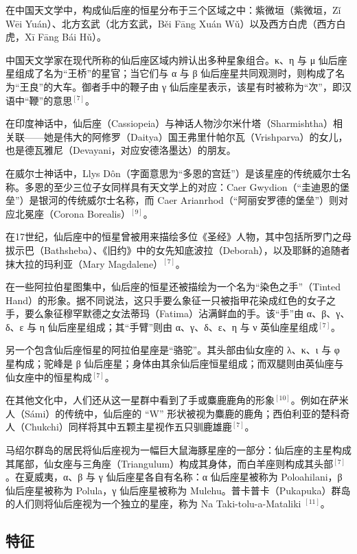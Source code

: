 在中国天文学中，构成仙后座的恒星分布于三个区域之中：紫微垣（紫微垣，Zǐ Wēi Yuán）、北方玄武（北方玄武，Běi Fāng Xuán Wǔ）以及西方白虎（西方白虎，Xī Fāng Bái Hǔ）。

中国天文学家在现代所称的仙后座区域内辨认出多种星象组合。κ、η 与 μ 仙后座星组成了名为“王桥”的星官；当它们与 α 与 β 仙后座星共同观测时，则构成了名为“王良”的大车。御者手中的鞭子由 γ 仙后座星表示，该星有时被称为“次”，即汉语中“鞭”的意思$^{[7]}$。

在印度神话中，仙后座（Cassiopeia）与神话人物沙尔米什塔（Sharmishtha）相关联——她是伟大的阿修罗（Daitya）国王弗里什帕尔瓦（Vrishparva）的女儿，也是德瓦雅尼（Devayani，对应安德洛墨达）的朋友。

在威尔士神话中，Llys Dôn（字面意思为“多恩的宫廷”）是该星座的传统威尔士名称。多恩的至少三位子女同样具有天文学上的对应：Caer Gwydion（“圭迪恩的堡垒”）是银河的传统威尔士名称，而 Caer Arianrhod（“阿丽安罗德的堡垒”）则对应北冕座（Corona Borealis）$^{[9]}$。

在17世纪，仙后座中的恒星曾被用来描绘多位《圣经》人物，其中包括所罗门之母拔示巴（Bathsheba）、《旧约》中的女先知底波拉（Deborah），以及耶稣的追随者抹大拉的玛利亚（Mary Magdalene）$^{[7]}$。

在一些阿拉伯星图集中，仙后座的恒星还被描绘为一个名为“染色之手”（Tinted Hand）的形象。据不同说法，这只手要么象征一只被指甲花染成红色的女子之手，要么象征穆罕默德之女法蒂玛（Fatima）沾满鲜血的手。该“手”由 α、β、γ、δ、ε 与 η 仙后座星组成；其“手臂”则由 α、γ、δ、ε、η 与 ν 英仙座星组成$^{[7]}$。

另一个包含仙后座恒星的阿拉伯星座是“骆驼”。其头部由仙女座的 λ、κ、ι 与 φ 星构成；驼峰是 β 仙后座星；身体由其余仙后座恒星组成；而双腿则由英仙座与仙女座中的恒星构成$^{[7]}$。

在其他文化中，人们还从这一星群中看到了手或麋鹿鹿角的形象$^{[10]}$。例如在萨米人（Sámi）的传统中，仙后座的 “W” 形状被视为麋鹿的鹿角；西伯利亚的楚科奇人（Chukchi）同样将其中五颗主星视作五只驯鹿雄鹿$^{[7]}$。

马绍尔群岛的居民将仙后座视为一幅巨大鼠海豚星座的一部分：仙后座的主星构成其尾部，仙女座与三角座（Triangulum）构成其身体，而白羊座则构成其头部$^{[7]}$。在夏威夷，α、β 与 γ 仙后座星各自有名称：α 仙后座星被称为 Poloahilani，β 仙后座星被称为 Polula，γ 仙后座星被称为 Mulehu。普卡普卡（Pukapuka）群岛的人们则将仙后座视为一个独立的星座，称为 Na Taki-tolu-a-Mataliki $^{[11]}$。
\subsection{特征}
